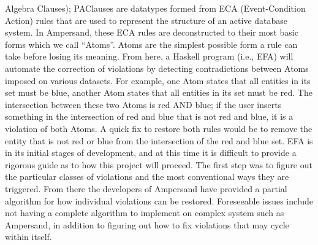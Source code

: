 \documentclass[12pt]{article}
\begin{document}
Algebra Clauses); PAClauses are datatypes formed from ECA (Event-Condition 
Action) rules that are used to represent the structure of an active database 
system. In Ampersand, these ECA rules are deconstructed to their most basic 
forms which we call “Atoms”. Atoms are the simplest possible form a rule can 
take before losing its meaning. From here, a Haskell program (i.e., EFA) will 
automate the correction of violations by detecting contradictions between Atoms 
imposed on various datasets. For example, one Atom states that all entities in 
its set must be blue, another Atom states that all entities in its set must be 
red. The intersection between these two Atoms is red AND blue; if the user 
inserts something in the intersection of red and blue that is not red and blue, 
it is a violation of both Atoms. A quick fix to restore both rules would be to 
remove the entity that is not red or blue from the intersection of the red and 
blue set. 
\newline
\indent EFA is in its initial stages of development, and at this time it is 
difficult to provide a rigorous guide as to how this project will proceed. The 
first step was to figure out the particular classes of violations and the most 
conventional ways they are triggered. From there the developers of Ampersand 
have provided a partial algorithm for how individual violations can be 
restored. Foreseeable issues include not having a complete algorithm to 
implement on complex system such as Ampersand, in addition to figuring out how 
to fix violations that may cycle within itself.
\end{document}
